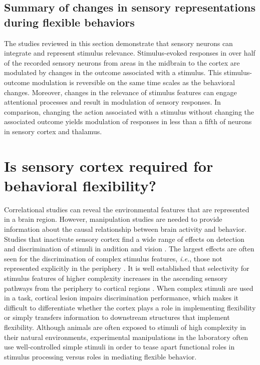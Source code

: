 \subsection{Summary of changes in sensory representations during flexible behaviors}
The studies reviewed in this section demonstrate that sensory neurons can integrate and represent stimulus relevance. Stimulus-evoked responses in over half of the recorded sensory neurons from areas in the midbrain to the cortex are modulated by changes in the outcome associated with a stimulus. This stimulus-outcome modulation is reversible on the same time scales as the behavioral changes. Moreover, changes in the relevance of stimulus features can engage attentional processes and result in modulation of sensory responses. In comparison, changing the action associated with a stimulus without changing the associated outcome yields modulation of responses in less than a fifth of neurons in sensory cortex and thalamus.

\section{Is sensory cortex required for behavioral flexibility?}

Correlational studies can reveal the environmental features that are represented in a brain region. However, manipulation studies are needed to provide information about the causal relationship between brain activity and behavior. 
Studies that inactivate sensory cortex find a wide range of effects on detection and discrimination of stimuli in audition \citep{Talwar2001, Rybalko2010, Gimenez2015, Kato2015} and vision \citep{Birch1978, Oakley1981, Glickfeld2013}. The largest effects are often seen for the discrimination of complex stimulus features, \emph{i.e.}, those not represented explicitly in the periphery \citep{Newsome1988, Ohl1999, Deutscher2006}. It is well established that selectivity for stimulus features of higher complexity increases in the ascending sensory pathways from the periphery to cortical regions \citep{Hubel1962, Miller2001a, Joris2004}.
%
When complex stimuli are used in a task, cortical lesion impairs discrimination performance, which makes it difficult to differentiate whether the cortex plays a role in implementing flexibility or simply transfers information to downstream structures that implement flexibility. Although animals are often exposed to stimuli of high complexity in their natural environments, experimental manipulations in the laboratory often use well-controlled simple stimuli in order to tease apart functional roles in stimulus processing versus roles in mediating flexible behavior.

